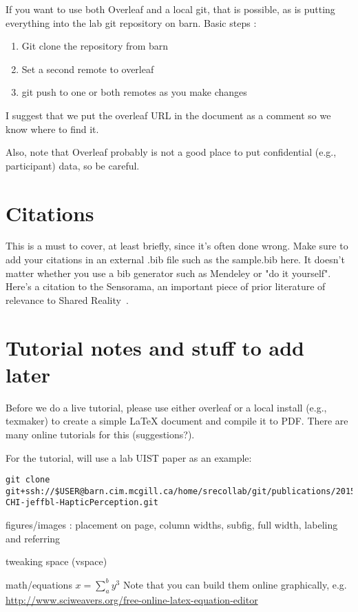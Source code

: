 \documentclass{sigchi}
\begin{document}
If you want to use both Overleaf and a local git, that is possible, as is putting everything into the lab git repository on barn.
Basic steps :

\begin{enumerate}
\item Git clone the repository from barn
\item Set a second remote to overleaf
\item git push to one or both remotes as you make changes
\end{enumerate}

I suggest that we put the overleaf URL in the document as a comment so we know where to find it.

Also, note that Overleaf probably is not a good place to put confidential (e.g., participant) data, so be careful.

\section{Citations}

This is a must to cover, at least briefly, since it's often done wrong.
Make sure to add your citations in an external .bib file such as the sample.bib here.
It doesn't matter whether you use a bib generator such as Mendeley or "do it yourself". 
Here's a citation to the Sensorama, an important piece of prior literature of relevance to Shared Reality~\cite{heilig:sensorama}.

\section{Tutorial notes and stuff to add later}

Before we do a live tutorial, please use either overleaf or a local install (e.g., texmaker) to create a simple LaTeX document and compile it to PDF.
There are many online tutorials for this (suggestions?).

For the tutorial, will use a lab UIST paper as an example:
\begin{verbatim}
git clone git+ssh://$USER@barn.cim.mcgill.ca/home/srecollab/git/publications/2015-CHI-jeffbl-HapticPerception.git
\end{verbatim}

figures/images : placement on page, column widths, subfig, full width, labeling and referring

tweaking space (vspace)

math/equations $x= \sum_a^b y^3$ Note that you can build them online graphically, e.g. \url{http://www.sciweavers.org/free-online-latex-equation-editor}
\end{document}
